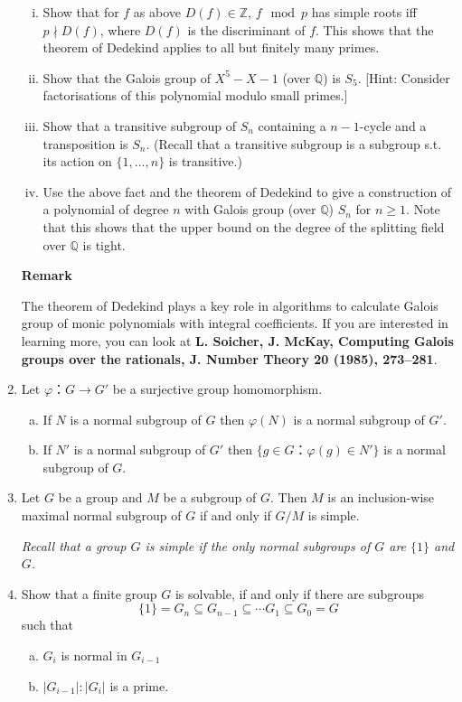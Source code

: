 \documentclass[12pt,a4paper]{article}
\begin{document}
\begin{enumerate}
\begin{enumerate}[i)]
    \item Show that for $f$ as above $D(f)\in\mathbb{Z}$, $f \mod p$ has simple roots iff $p \nmid D(f)$, where $D(f)$ is the discriminant of $f$. This shows that the theorem of Dedekind applies to all but finitely many primes.
    \item Show that the Galois group of $X^5-X-1$ (over $\mathbb{Q}$) is $S_5$. [Hint: Consider factorisations of this polynomial modulo small primes.]
    \item Show that a transitive subgroup of $S_n$ containing a $n-1$-cycle and a transposition is $S_n$. (Recall that a transitive subgroup is a subgroup s.t. its action on $\{1,...,n\}$ is transitive.)
    \item Use the above fact and the theorem of Dedekind to give a construction of a polynomial of degree $n$ with Galois group (over $\mathbb{Q}$) $S_n$ for $n\geq 1$. Note that this shows that the upper bound on the degree of the splitting field over $\mathbb{Q}$ is tight. 
    
\end{enumerate}

\textbf{Remark}

The theorem of Dedekind plays a key role in algorithms to calculate Galois group of monic polynomials with integral coefficients. If you are interested in learning more, you can look at \textbf{L. Soicher, J. McKay, Computing Galois groups over the rationals, J. Number Theory 20 (1985), 273–281}.

\item Let $φ： G →  G'$  be a surjective  group homomorphism.
  \begin{enumerate}[a)]
  \item If $N $ is a normal subgroup of $G$ then $φ(N)$ is a normal subgroup of $G'$.
  \item If $N'$ is a normal subgroup of $G'$ then $\{ g ∈ G ： φ(g) ∈ N'\}$ is a normal subgroup of $G$. 
  \end{enumerate}

\item
  Let $G$ be a group and $M$ be a subgroup of $G$. Then $M$ is an inclusion-wise maximal normal subgroup of $G$ if and only if $G/M$ is simple.

  \emph{Recall that  a group $G$ is simple if the only normal subgroups of $G$ are $\{1\}$ and $G$.}
\item Show that a finite group $G$ is solvable, if and only if there are subgroups
  \begin{displaymath}
    \{1\} = G_n ⊆G_{n-1}⊆ \cdots G_1 ⊆G_0 = G  
  \end{displaymath}
  such that
  \begin{enumerate}[a)]
  \item $G_i$ is normal in $G_{i-1}$
  \item $|G_{i-1}| : |G_i|$ is a prime. 
  \end{enumerate}
\end{enumerate}
\end{document}
